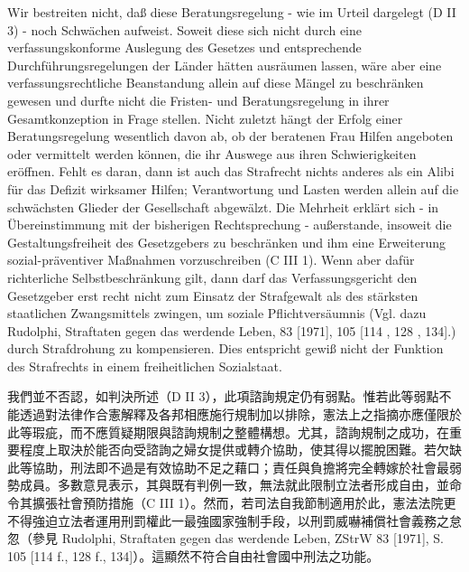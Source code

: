 \documentclass[12pt]{article}
\begin{document}
\syncleft
\begin{sourcepara}
Wir bestreiten nicht, daß diese Beratungsregelung - wie im Urteil dargelegt (D II 3) - noch Schwächen aufweist. Soweit diese sich nicht durch eine verfassungskonforme Auslegung des Gesetzes und entsprechende Durchführungsregelungen der Länder hätten ausräumen lassen, wäre aber eine verfassungsrechtliche Beanstandung allein auf diese Mängel zu beschränken gewesen und durfte nicht die Fristen- und Beratungsregelung in ihrer Gesamtkonzeption in Frage stellen. Nicht zuletzt hängt der Erfolg einer Beratungsregelung wesentlich davon ab, ob der beratenen Frau Hilfen angeboten oder vermittelt werden können, die ihr Auswege aus ihren Schwierigkeiten eröffnen. Fehlt es daran, dann ist auch das Strafrecht nichts anderes als ein Alibi für das Defizit wirksamer Hilfen; Verantwortung und Lasten werden allein auf die schwächsten Glieder der Gesellschaft abgewälzt. Die Mehrheit erklärt sich - in Übereinstimmung mit der bisherigen Rechtsprechung - außerstande, insoweit die Gestaltungsfreiheit des Gesetzgebers zu beschränken und ihm eine Erweiterung sozial-präventiver Maßnahmen vorzuschreiben (C III 1). Wenn aber dafür richterliche Selbstbeschränkung gilt, dann darf das Verfassungsgericht den Gesetzgeber erst recht nicht zum Einsatz der Strafgewalt als des stärksten staatlichen Zwangsmittels zwingen, um soziale Pflichtversäumnis (Vgl. dazu Rudolphi, Straftaten gegen das werdende Leben, \abbrZStrW{} 83 [1971], \abbrS{} 105 [114 \abbrF{}, 128 \abbrF{}, 134].) durch Strafdrohung zu kompensieren. Dies entspricht gewiß nicht der Funktion des Strafrechts in einem freiheitlichen Sozialstaat.
\end{sourcepara}
\begin{transpara}
我們並不否認，如判決所述（D II 3），此項諮詢規定仍有弱點。惟若此等弱點不能透過對法律作合憲解釋及各邦相應施行規制加以排除，憲法上之指摘亦應僅限於此等瑕疵，而不應質疑期限與諮詢規制之整體構想。尤其，諮詢規制之成功，在重要程度上取決於能否向受諮詢之婦女提供或轉介協助，使其得以擺脫困難。若欠缺此等協助，刑法即不過是有效協助不足之藉口；責任與負擔將完全轉嫁於社會最弱勢成員。多數意見表示，其與既有判例一致，無法就此限制立法者形成自由，並命令其擴張社會預防措施（C III 1）。然而，若司法自我節制適用於此，憲法法院更不得強迫立法者運用刑罰權此一最強國家強制手段，以刑罰威嚇補償社會義務之怠忽（參見 Rudolphi, Straftaten gegen das werdende Leben, ZStrW 83 [1971], S. 105 [114 f., 128 f., 134]）。這顯然不符合自由社會國中刑法之功能。
\end{transpara}
\end{document}
